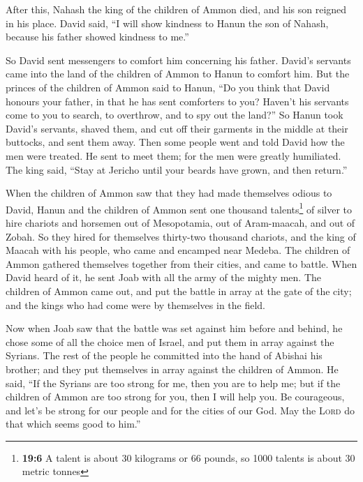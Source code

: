  After this, Nahash the king of the children of Ammon
died, and his son reigned in his place.  David said, ``I
will show kindness to Hanun the son of Nahash, because his father showed
kindness to me.''

So David sent messengers to comfort him concerning his father. David's
servants came into the land of the children of Ammon to Hanun to comfort
him.  But the princes of the children of Ammon said to
Hanun, ``Do you think that David honours your father, in that he has
sent comforters to you? Haven't his servants come to you to search, to
overthrow, and to spy out the land?''  So Hanun took
David's servants, shaved them, and cut off their garments in the middle
at their buttocks, and sent them away.  Then some people
went and told David how the men were treated. He sent to meet them; for
the men were greatly humiliated. The king said, ``Stay at Jericho until
your beards have grown, and then return.''

 When the children of Ammon saw that they had made
themselves odious to David, Hanun and the children of Ammon sent one
thousand talents\footnote{\textbf{19:6} A talent is about 30 kilograms
  or 66 pounds, so 1000 talents is about 30 metric tonnes} of silver to
hire chariots and horsemen out of Mesopotamia, out of Aram-maacah, and
out of Zobah.  So they hired for themselves thirty-two
thousand chariots, and the king of Maacah with his people, who came and
encamped near Medeba. The children of Ammon gathered themselves together
from their cities, and came to battle.  When David heard
of it, he sent Joab with all the army of the mighty men. 
The children of Ammon came out, and put the battle in array at the gate
of the city; and the kings who had come were by themselves in the field.

 Now when Joab saw that the battle was set against him
before and behind, he chose some of all the choice men of Israel, and
put them in array against the Syrians.  The rest of the
people he committed into the hand of Abishai his brother; and they put
themselves in array against the children of Ammon.  He
said, ``If the Syrians are too strong for me, then you are to help me;
but if the children of Ammon are too strong for you, then I will help
you.  Be courageous, and let's be strong for our people
and for the cities of our God. May the \textsc{Lord} do that which seems
good to him.''

